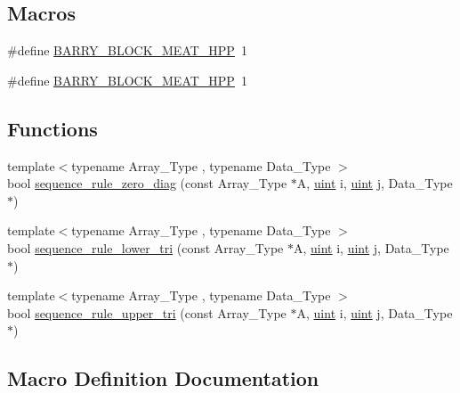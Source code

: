 \subsection*{Macros}
\begin{DoxyCompactItemize}
\item 
\#define \hyperlink{barry_8hpp_ad32bbe588fc2f7e5cfbfa9a737eb67a4}{B\+A\+R\+R\+Y\+\_\+\+B\+L\+O\+C\+K\+\_\+\+M\+E\+A\+T\+\_\+\+H\+PP}~1
\item 
\#define \hyperlink{block-meat_8hpp_ad32bbe588fc2f7e5cfbfa9a737eb67a4}{B\+A\+R\+R\+Y\+\_\+\+B\+L\+O\+C\+K\+\_\+\+M\+E\+A\+T\+\_\+\+H\+PP}~1
\end{DoxyCompactItemize}
\subsection*{Functions}
\begin{DoxyCompactItemize}
\item 
{\footnotesize template$<$typename Array\+\_\+\+Type , typename Data\+\_\+\+Type $>$ }\\bool \hyperlink{block-meat_8hpp_a0d46af0e4cb648e744267bc926870c56}{sequence\+\_\+rule\+\_\+zero\+\_\+diag} (const Array\+\_\+\+Type $\ast$A, \hyperlink{typedefs_8hpp_a91ad9478d81a7aaf2593e8d9c3d06a14}{uint} i, \hyperlink{typedefs_8hpp_a91ad9478d81a7aaf2593e8d9c3d06a14}{uint} j, Data\+\_\+\+Type $\ast$)
\item 
{\footnotesize template$<$typename Array\+\_\+\+Type , typename Data\+\_\+\+Type $>$ }\\bool \hyperlink{block-meat_8hpp_a1e0c9474a332f7f0feacb6c83db47e09}{sequence\+\_\+rule\+\_\+lower\+\_\+tri} (const Array\+\_\+\+Type $\ast$A, \hyperlink{typedefs_8hpp_a91ad9478d81a7aaf2593e8d9c3d06a14}{uint} i, \hyperlink{typedefs_8hpp_a91ad9478d81a7aaf2593e8d9c3d06a14}{uint} j, Data\+\_\+\+Type $\ast$)
\item 
{\footnotesize template$<$typename Array\+\_\+\+Type , typename Data\+\_\+\+Type $>$ }\\bool \hyperlink{block-meat_8hpp_af5065fcabecdb2c3eedc5f95389aadfc}{sequence\+\_\+rule\+\_\+upper\+\_\+tri} (const Array\+\_\+\+Type $\ast$A, \hyperlink{typedefs_8hpp_a91ad9478d81a7aaf2593e8d9c3d06a14}{uint} i, \hyperlink{typedefs_8hpp_a91ad9478d81a7aaf2593e8d9c3d06a14}{uint} j, Data\+\_\+\+Type $\ast$)
\end{DoxyCompactItemize}


\subsection{Macro Definition Documentation}
\mbox{\label{barry_8hpp_ad32bbe588fc2f7e5cfbfa9a737eb67a4}} 
